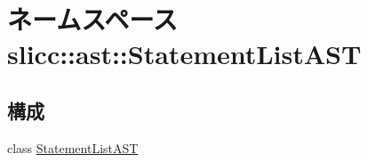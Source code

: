\hypertarget{namespaceslicc_1_1ast_1_1StatementListAST}{
\section{ネームスペース slicc::ast::StatementListAST}
\label{namespaceslicc_1_1ast_1_1StatementListAST}
}
\subsection*{構成}
\begin{DoxyCompactItemize}
\item 
class \hyperlink{classslicc_1_1ast_1_1StatementListAST_1_1StatementListAST}{StatementListAST}
\end{DoxyCompactItemize}
